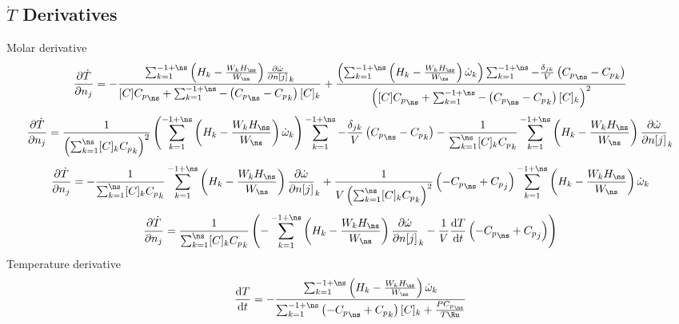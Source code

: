 \documentclass[a4paper,10pt]{article}
\begin{document}
\subsection{\texorpdfstring{$\dot{T}$}{dTdt} Derivatives}
Molar derivative
\begin{dmath} \frac{\partial\dot{T}}{\partial{n_j}} = - \frac{\sum_{k=1}^{-1 + \ns} \left(H_{k} - \frac{W_{k} H_{\ns}}{W_{\ns}}\right) \frac{\partial \dot{\omega} }{\partial n[j] }_{k}}{[C] {C_p}_{\ns} + \sum_{k=1}^{-1 + \ns} - \left({C_p}_{\ns} - {C_p}_{k}\right) [C]_{k}} + \frac{\left(\sum_{k=1}^{-1 + \ns} \left(H_{k} - \frac{W_{k} H_{\ns}}{W_{\ns}}\right) \dot{\omega}_{k}\right) \sum_{k=1}^{-1 + \ns} - \frac{\delta_{j k}}{V} \left({C_p}_{\ns} - {C_p}_{k}\right)}{\left([C] {C_p}_{\ns} + \sum_{k=1}^{-1 + \ns} - \left({C_p}_{\ns} - {C_p}_{k}\right) [C]_{k}\right)^{2}}\end{dmath} 
\begin{dmath} \frac{\partial\dot{T}}{\partial{n_j}} = \frac{1}{\left(\sum_{k=1}^{\ns} [C]_{k} {C_p}_{k}\right)^{2}} \left(\sum_{k=1}^{-1 + \ns} \left(H_{k} - \frac{W_{k} H_{\ns}}{W_{\ns}}\right) \dot{\omega}_{k}\right) \sum_{k=1}^{-1 + \ns} - \frac{\delta_{j k}}{V} \left({C_p}_{\ns} - {C_p}_{k}\right) - \frac{1}{\sum_{k=1}^{\ns} [C]_{k} {C_p}_{k}} \sum_{k=1}^{-1 + \ns} \left(H_{k} - \frac{W_{k} H_{\ns}}{W_{\ns}}\right) \frac{\partial \dot{\omega} }{\partial n[j] }_{k}\end{dmath} 
\begin{dmath} \frac{\partial\dot{T}}{\partial{n_j}} = - \frac{1}{\sum_{k=1}^{\ns} [C]_{k} {C_p}_{k}} \sum_{k=1}^{-1 + \ns} \left(H_{k} - \frac{W_{k} H_{\ns}}{W_{\ns}}\right) \frac{\partial \dot{\omega} }{\partial n[j] }_{k} + \frac{1}{V \left(\sum_{k=1}^{\ns} [C]_{k} {C_p}_{k}\right)^{2}} \left(- {C_p}_{\ns} + {C_p}_{j}\right) \sum_{k=1}^{-1 + \ns} \left(H_{k} - \frac{W_{k} H_{\ns}}{W_{\ns}}\right) \dot{\omega}_{k}\end{dmath} 
\begin{dmath} \frac{\partial\dot{T}}{\partial{n_j}} = \frac{1}{\sum_{k=1}^{\ns} [C]_{k} {C_p}_{k}} \left(- \sum_{k=1}^{-1 + \ns} \left(H_{k} - \frac{W_{k} H_{\ns}}{W_{\ns}}\right) \frac{\partial \dot{\omega} }{\partial n[j] }_{k} - \frac{1}{V} \frac{\text{d} T }{\text{d} t } \left(- {C_p}_{\ns} + {C_p}_{j}\right)\right)\end{dmath} 
Temperature derivative
\begin{dmath} \frac{\text{d} T }{\text{d} t } = - \frac{\sum_{k=1}^{-1 + \ns} \left(H_{k} - \frac{W_{k} H_{\ns}}{W_{\ns}}\right) \dot{\omega}_{k}}{\sum_{k=1}^{-1 + \ns} \left(- {C_p}_{\ns} + {C_p}_{k}\right) [C]_{k} + \frac{P {C_p}_{\ns}}{T \Ru}}\end{dmath} 
\end{document}

